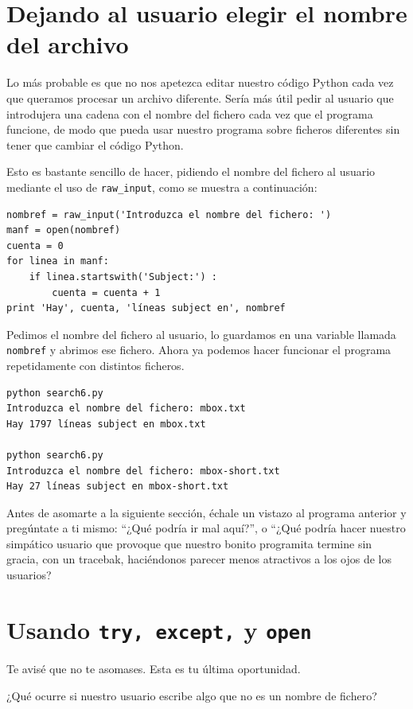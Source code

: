 \section{Dejando al usuario elegir el nombre del archivo}

Lo más probable es que no nos apetezca editar nuestro código Python
cada vez que queramos procesar un archivo diferente. Sería
más útil pedir al usuario que introdujera una cadena con el nombre del fichero
cada vez que el programa funcione, de modo que pueda usar nuestro
programa sobre ficheros diferentes sin tener que cambiar el código Python.

Esto es bastante sencillo de hacer, pidiendo el nombre del fichero al
usuario mediante el uso de \verb"raw_input", como se muestra a continuación:

\beforeverb
\begin{verbatim}
nombref = raw_input('Introduzca el nombre del fichero: ')
manf = open(nombref)
cuenta = 0
for linea in manf:
    if linea.startswith('Subject:') :
        cuenta = cuenta + 1
print 'Hay', cuenta, 'líneas subject en', nombref
\end{verbatim}
\afterverb
%
Pedimos el nombre del fichero al usuario, lo guardamos en una variable
llamada {\tt nombref} y abrimos ese fichero. Ahora ya podemos hacer funcionar
el programa repetidamente con distintos ficheros.

\beforeverb
\begin{verbatim}
python search6.py 
Introduzca el nombre del fichero: mbox.txt
Hay 1797 líneas subject en mbox.txt

python search6.py 
Introduzca el nombre del fichero: mbox-short.txt
Hay 27 líneas subject en mbox-short.txt
\end{verbatim}
\afterverb
%
Antes de asomarte a la siguiente sección, échale un vistazo al programa anterior
y pregúntate a ti mismo: ``¿Qué podría ir mal aquí?'', o ``¿Qué podría hacer
nuestro simpático usuario que provoque que nuestro bonito programita
termine sin gracia, con un tracebak, haciéndonos parecer menos atractivos
a los ojos de los usuarios?

\section{Usando {\tt try, except,} y {\tt open}}

Te avisé que no te asomases. Esta es tu última oportunidad.

¿Qué ocurre si nuestro usuario escribe algo que no es un nombre de fichero?

